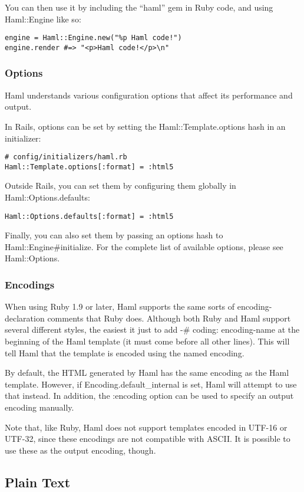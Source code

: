 \documentclass[10pt]{article}
\begin{document}
 You can then use it by including the “haml” gem in Ruby code, and using Haml::Engine like so:
\begin{verbatim}
engine = Haml::Engine.new("%p Haml code!")
engine.render #=> "<p>Haml code!</p>\n"
\end{verbatim}
\subsubsection*{Options}


 Haml understands various configuration options that affect its performance and output.


 In Rails, options can be set by setting the Haml::Template.options hash in an initializer:
\begin{verbatim}
# config/initializers/haml.rb
Haml::Template.options[:format] = :html5
\end{verbatim}


 Outside Rails, you can set them by configuring them globally in Haml::Options.defaults:
\begin{verbatim}
Haml::Options.defaults[:format] = :html5
\end{verbatim}


 Finally, you can also set them by passing an options hash to Haml::Engine\#initialize. For the complete list of available options, please see Haml::Options.
\subsubsection*{Encodings}


 When using Ruby 1.9 or later, Haml supports the same sorts of encoding-declaration comments that Ruby does. Although both Ruby and Haml support several different styles, the easiest it just to add -\# coding: encoding-name at the beginning of the Haml template (it must come before all other lines). This will tell Haml that the template is encoded using the named encoding.


 By default, the HTML generated by Haml has the same encoding as the Haml template. However, if Encoding.default\_internal is set, Haml will attempt to use that instead. In addition, the :encoding option can be used to specify an output encoding manually.


 Note that, like Ruby, Haml does not support templates encoded in UTF-16 or UTF-32, since these encodings are not compatible with ASCII. It is possible to use these as the output encoding, though.
\subsection*{Plain Text}
\end{document}
